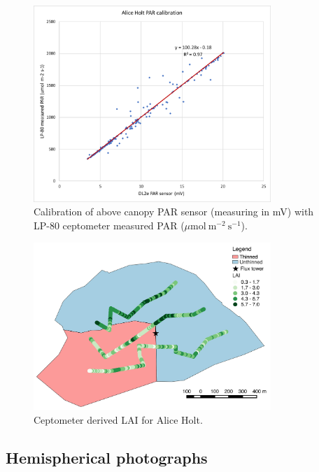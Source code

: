 \documentclass[11pt]{article}
\begin{document}
\begin{figure}[ht]
    \centering
    \includegraphics[width=0.8\textwidth]{AH_PAR.pdf}
    \caption{Calibration of above canopy PAR sensor (measuring in mV) with LP-80 ceptometer measured PAR (\(\mu \text{mol}~\text{m}^{-2}~\text{s}^{-1} \)).} \label{fig:hemi_lai}
\end{figure}

\begin{figure}[ht]
    \centering
    \includegraphics[width=0.8\textwidth]{lai_cept.pdf}
    \caption{Ceptometer derived LAI for Alice Holt.} \label{fig:cept_lai}
\end{figure}

\subsection{Hemispherical photographs}
\end{document}
